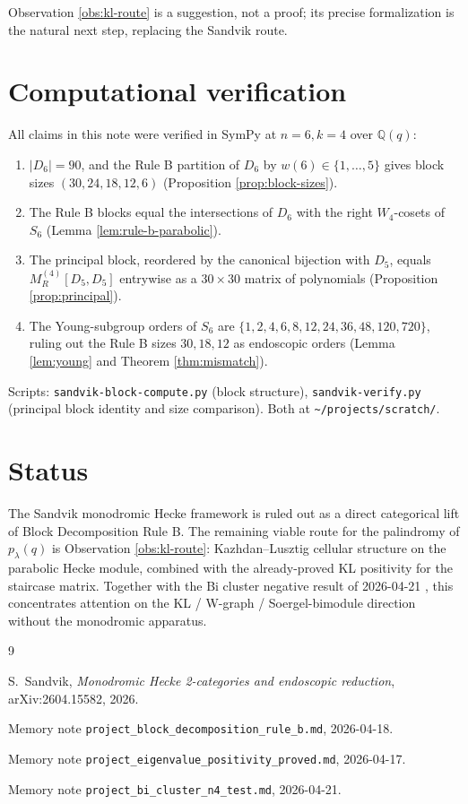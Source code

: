 \documentclass[11pt]{article}
\theoremstyle{definition}
\begin{document}
Observation \ref{obs:kl-route} is a suggestion, not a proof; its precise formalization
is the natural next step, replacing the Sandvik route.

\section{Computational verification}

All claims in this note were verified in SymPy at $n=6, k=4$ over $\mathbb{Q}(q)$:

\begin{enumerate}
\item $|D_6| = 90$, and the Rule B partition of $D_6$ by $w(6) \in \{1,\ldots,5\}$
gives block sizes $(30, 24, 18, 12, 6)$ (Proposition \ref{prop:block-sizes}).
\item The Rule B blocks equal the intersections of $D_6$ with the right
$W_4$-cosets of $S_6$ (Lemma \ref{lem:rule-b-parabolic}).
\item The principal block, reordered by the canonical bijection with $D_5$, equals
$M_R^{(4)}[D_5, D_5]$ entrywise as a $30 \times 30$ matrix of polynomials
(Proposition \ref{prop:principal}).
\item The Young-subgroup orders of $S_6$ are $\{1, 2, 4, 6, 8, 12, 24, 36, 48, 120, 720\}$,
ruling out the Rule B sizes $30, 18, 12$ as endoscopic orders (Lemma \ref{lem:young}
and Theorem \ref{thm:mismatch}).
\end{enumerate}

Scripts: \texttt{sandvik-block-compute.py} (block structure),
\texttt{sandvik-verify.py} (principal block identity and size comparison).
Both at \texttt{\~{}/projects/scratch/}.

\section{Status}

The Sandvik monodromic Hecke framework is ruled out as a direct categorical lift of
Block Decomposition Rule B. The remaining viable route for the palindromy of
$p_\lambda(q)$ is Observation \ref{obs:kl-route}: Kazhdan--Lusztig cellular structure
on the parabolic Hecke module, combined with the already-proved KL positivity for
the staircase matrix. Together with the Bi cluster negative result of
2026-04-21 \cite{memory:bi-cluster-n4-test}, this concentrates attention on the
KL / W-graph / Soergel-bimodule direction without the monodromic apparatus.

\begin{thebibliography}{9}

S.~Sandvik,
\emph{Monodromic Hecke 2-categories and endoscopic reduction},
arXiv:2604.15582, 2026.

Memory note \texttt{project\_block\_decomposition\_rule\_b.md}, 2026-04-18.

Memory note \texttt{project\_eigenvalue\_positivity\_proved.md}, 2026-04-17.

Memory note \texttt{project\_bi\_cluster\_n4\_test.md}, 2026-04-21.

\end{thebibliography}
\end{document}
